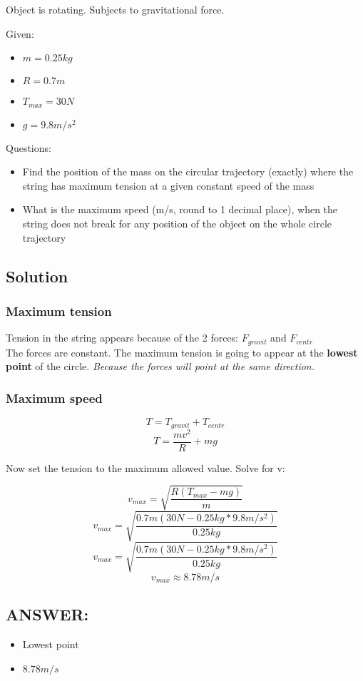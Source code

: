 
Object is rotating. Subjects to gravitational force.


\bigbreak Given: 
\begin{itemize}
    \item $  m  = 0.25kg $
    \item $ R = 0.7m $
    \item $ T_{max} = 30N $
    \item $ g = 9.8m/s^2 $
\end{itemize}


\bigbreak Questions:
\begin{itemize}
    \item Find the position of the mass on the circular trajectory (exactly) where the string has
    maximum tension at a given constant speed of the mass
    \item What is the maximum speed (m/s, round to 1 decimal place), when the string does not
    break for any position of the object on the whole circle trajectory
\end{itemize}

\subsection*{Solution}
\subsubsection*{Maximum tension}
Tension in the string appears because of the 2 forces: $F_{gravit}$ and $F_{centr}$ \\
The forces are constant. The maximum tension is going to appear at the \textbf{lowest point} of the circle.
\textit{Because the forces will point at the same direction.}


\subsubsection*{Maximum speed}
$$ T = T_{gravit} + T_{centr} $$
$$ T = \frac{mv^2}{R} + mg $$

Now set the tension to the maximum allowed value. Solve for v:

$$  v_{max} =  \sqrt{\frac{R(T_{max} - mg)}{m}} $$
$$  v_{max} =  \sqrt{\frac{0.7m(30N - 0.25kg * 9.8m/s^2)}{0.25kg}} $$
$$  v_{max} =  \sqrt{\frac{0.7m(30N - 0.25kg * 9.8m/s^2)}{0.25kg}} $$
$$  v_{max} \approx  \boxed{8.78m/s} $$

\newpage \vfill \subsection*{ANSWER:}

\begin{itemize}
    \item Lowest point
    \item $8.78m/s$
\end{itemize}



